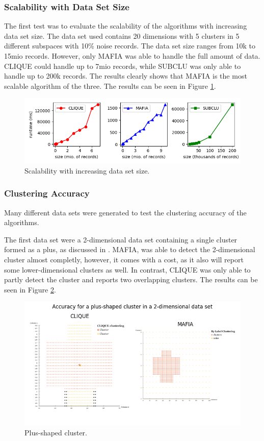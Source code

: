 \subsubsection{Scalability with Data Set Size}
The first test was to evaluate the scalability of the algorithms with increasing data set size. The data set used contains 20 dimensions with 5 clusters in 5 different subspaces with 10\% noise records. The data set size ranges from 10k to 15mio records. However, only MAFIA was able to handle the full amount of data. CLIQUE could handle up to 7mio records, while SUBCLU was only able to handle up to 200k records. The results clearly shows that MAFIA is the most scalable algorithm of the three. The results can be seen in Figure \ref{fig:dataset_size_vs_runtime}.
\begin{figure}
    \centering
    \includegraphics[scale=0.5]{figures/dataset_size_vs_runtime.png}
    \caption{Scalability with increasing data set size.}
    \label{fig:dataset_size_vs_runtime}
\end{figure}

\subsubsection{Clustering Accuracy}
Many different data sets were generated to test the clustering accuracy of the algorithms.

The first data set were a 2-dimensional data set containing a single cluster formed as a plus, as discussed in \cite{mafia}. MAFIA, was able to detect the 2-dimensional cluster almost completly, however, it comes with a cost, as it also will report some lower-dimensional clusters as well. In contrast, CLIQUE was only able to partly detect the cluster and reports two overlapping clusters. The results can be seen in Figure \ref{fig:accuracy_plus}.
\begin{figure}
    \centering
    \includegraphics[scale=0.32]{figures/accuracy_plus.png}
    \caption{Plus-shaped cluster.}
    \label{fig:accuracy_plus}
\end{figure}

